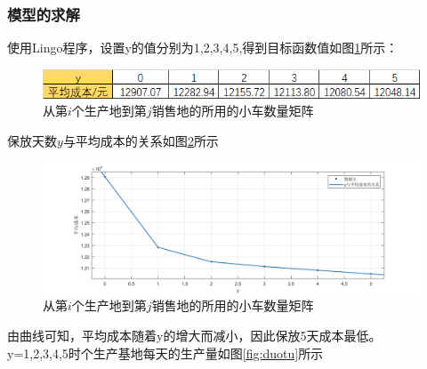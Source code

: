 \documentclass{article}
\begin{document}
	\subsubsection{模型的求解}
	使用Lingo程序，设置y的值分别为1,2,3,4,5,得到目标函数值如图\ref{fig:chengben}所示：
	\begin{figure}[H]
		\centering
		\includegraphics[width=1.0\linewidth]{img/chengben.png}
		\caption{从第$i$个生产地到第$j$销售地的所用的小车数量矩阵}
		\label{fig:chengben}
	\end{figure}
    保放天数$y$与平均成本的关系如图\ref{fig:qvxian}所示
	\begin{figure}[H]
		\centering
		\includegraphics[width=1.0\linewidth]{img/qvxian.png}
		\caption{从第$i$个生产地到第$j$销售地的所用的小车数量矩阵}
		\label{fig:qvxian}
	\end{figure}
    \par 由曲线可知，平均成本随着y的增大而减小，因此保放5天成本最低。\\
    y=1,2,3,4,5时个生产基地每天的生产量如图\ref{fig:duotu}所示
\end{document}
